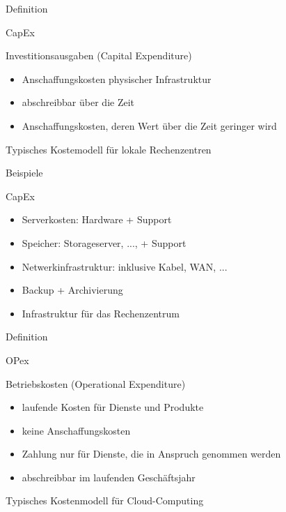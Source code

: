 \documentclass{scrartcl}
\newenvironment{flashcard}[2][]{%
    #1
    \vfill
    \centerline{\Large{#2}}
    \vfill
    \newpage
}
{\newpage}
\begin{document}
    \begin{flashcard}[Definition]{CapEx}
        
        Investitionsausgaben (Capital Expenditure)
        \begin{itemize}
            \item Anschaffungskosten physischer Infrastruktur
            \item abschreibbar über die Zeit
            \item Anschaffungskosten, deren Wert über die Zeit geringer wird
        \end{itemize}

        Typisches Kostemodell für lokale Rechenzentren

    \end{flashcard}
    
    \begin{flashcard}[Beispiele]{CapEx}
        \begin{itemize}
            \item Serverkosten: Hardware + Support
            \item Speicher: Storageserver, ..., + Support
            \item Netwerkinfrastruktur: inklusive Kabel, WAN, ...
            \item Backup + Archivierung
            \item Infrastruktur für das Rechenzentrum
        \end{itemize}
    \end{flashcard}

    \begin{flashcard}[Definition]{OPex}
        Betriebskosten (Operational Expenditure)
        \begin{itemize}
            \item laufende Kosten für Dienste und Produkte
            \item keine Anschaffungskosten
            \item Zahlung nur für Dienste, die in Anspruch genommen werden
            \item abschreibbar im laufenden Geschäftsjahr
        \end{itemize}

        Typisches Kostenmodell für Cloud-Computing
    \end{flashcard}
\end{document}
